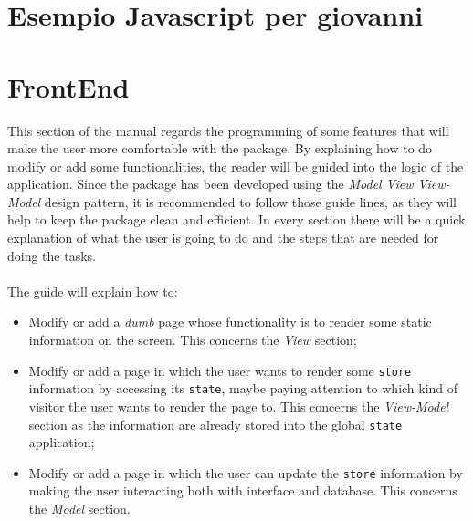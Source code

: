 \section{Esempio Javascript per giovanni}

\section{FrontEnd}
This section of the manual regards the programming of some features that will make the user more comfortable with the package. By explaining how to do modify or add some functionalities, the reader will be guided into the logic of the application.
Since the package has been developed using the \emph{Model View View-Model} design pattern, it is recommended to follow those guide lines, as they will help to keep the package clean and efficient. In every section there will be a quick explanation of what the user is going to do and the steps that are needed for doing the tasks.
~\\~\\The guide will explain how to:
\begin{itemize}
	\item Modify or add a \textit{dumb} page whose functionality is to render some static information on the screen. This concerns the \emph{View} section;
	\item Modify or add a page in which the user wants to render some \verb|store| information by accessing its \verb|state|, maybe paying attention to which kind of visitor the user wants to render the page to. This concerns the \emph{View-Model} section as the information are already stored into the global \verb|state| application;
	\item Modify or add a page in which the user can update the \verb|store| information by making the user interacting both with interface and database. This concerns the \emph{Model} section.
\end{itemize}

